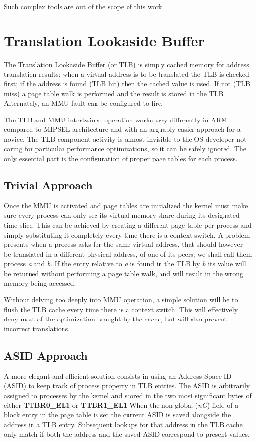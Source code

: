 \documentclass[12pt,a4paper,openright,twoside]{report}
\begin{document}
Such complex tools are out of the scope of this work.


\section{Translation Lookaside Buffer}
\label{tlb}
The Translation Lookaside Buffer (or TLB) is simply cached memory for address translation
results: when a virtual address is to be translated the TLB is checked first;
if the address is found (TLB hit) then the cached value is used. If not (TLB miss)
a page table walk is performed and the result is stored in the TLB. Alternately,
an MMU fault can be configured to fire.

The TLB and MMU intertwined operation works very differently in ARM compared to 
MIPSEL architecture and with an arguably easier approach for a novice. The TLB 
component activity is almost invisible to the OS developer not caring for 
particular performance optimizations, so it can be safely ignored. The only 
essential part is the configuration of proper page tables for each process.

\subsection{Trivial Approach}
Once the MMU is activated and page tables are initialized the kernel must make 
sure every process can only see its virtual memory share during its designated
time slice. This can be achieved by creating a different page table per process
and simply substituting it completely every time there is a context switch.
A problem presents when a process asks for the same virtual address, that should
however be translated in a different physical address, of one of its peers; 
we shall call them process \textit{a} and \textit{b}.
If the entry relative to \textit{a} is found in the TLB by \textit{b} its value
will be returned without performing a page table walk, and will result in the
wrong memory being accessed.

Without delving too deeply into MMU operation, a simple solution will be to 
flush the TLB cache every time there is a context switch. This will effectively
deny most of the optimization brought by the cache, but will also prevent
incorrect translations.

\subsection{ASID Approach}
A more elegant and efficient solution consists in using an Address Space ID (ASID)
to keep track of process property in TLB entries. The ASID is arbitrarily assigned
to processes by the kernel and stored in the two most significant bytes of either
\textbf{TTBR0\_EL1} or \textbf{TTBR1\_EL1}
When the non-global (\textit{nG}) field of a block entry in the page table is 
set the current ASID is saved alongside the address in a TLB entry. Subsequent
lookups for that address in the TLB cache only match if both the address and the
saved ASID correspond to present values.
\end{document}

